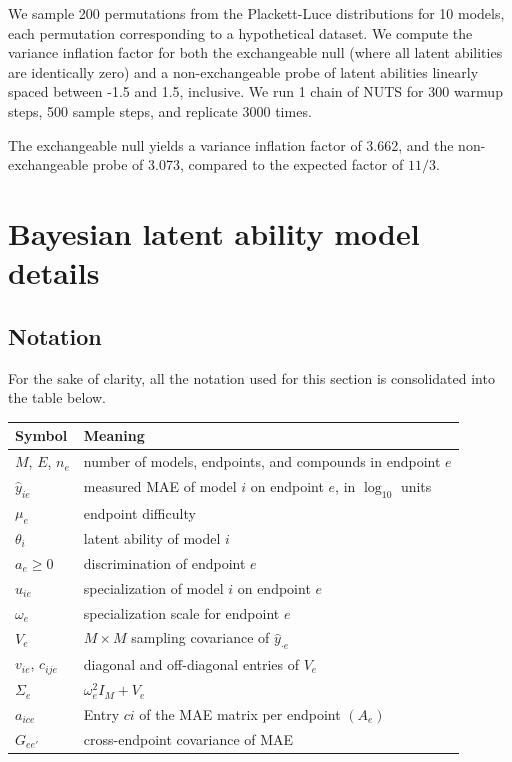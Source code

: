 \documentclass{article}
\begin{document}
We sample 200 permutations from the Plackett-Luce distributions for 10 models, each permutation corresponding to a hypothetical dataset. We compute the variance inflation factor for both the exchangeable null (where all latent abilities are identically zero) and a non-exchangeable probe of latent abilities linearly spaced between -1.5 and 1.5, inclusive. We run 1 chain of NUTS for 300 warmup steps, 500 sample steps, and replicate 3000 times.

The exchangeable null yields a variance inflation factor of 3.662, and the non-exchangeable probe of 3.073, compared to the expected factor of $11/3$.


\section{Bayesian latent ability model details}
\label{app:blam}

\subsection{Notation}
For the sake of clarity, all the notation used for this section is consolidated into the table below.

\begin{table}[h]
  \centering
  \small
  \begin{tabular}{ll}
    \toprule
    Symbol & Meaning \\
    \midrule
    $M$, $E$, $n_e$ & number of models, endpoints, and compounds in endpoint $e$ \\
    $\hat{y}_{ie}$ & measured MAE of model $i$ on endpoint $e$, in $\log_{10}$ units \\
    $\mu_e$ & endpoint difficulty \\
    $\theta_i$ & latent ability of model $i$ \\
    $a_e \geq 0$ & discrimination of endpoint $e$ \\
    $u_{ie}$ & specialization of model $i$ on endpoint $e$ \\
    $\omega_e$ & specialization scale for endpoint $e$ \\
    $V_e$ & $M \times M$ sampling covariance of $\hat{y}_{\cdot e}$ \\
    $v_{ie}$, $c_{ije}$ & diagonal and off-diagonal entries of $V_e$ \\
    $\Sigma_e$ & $\omega_e^2 I_M + V_e$ \\
    $a_{ice}$ & Entry $ci$ of the MAE matrix per endpoint $(A_e)$ \\
    $G_{ee'}$ & cross-endpoint covariance of MAE \\
    \bottomrule
  \end{tabular}
\end{table}
\end{document}
